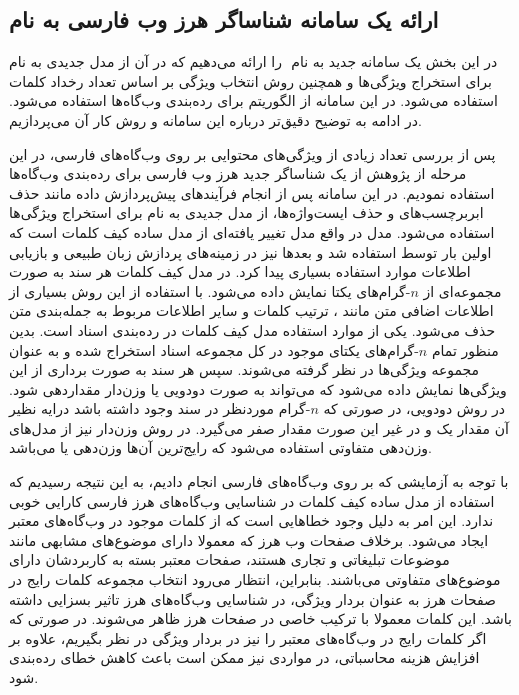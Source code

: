 \documentclass[twoside, a4paper,11pt]{book}
\numberwithin{equation}{chapter}
\numberwithin{table}{chapter}
\numberwithin{figure}{chapter}
\numberwithin{equation}{chapter}
\begin{document}
\subsection{ارائه یک سامانه شناساگر هرز وب فارسی به نام }
\label{section:methodology-bosw}
در این بخش یک سامانه جدید به نام ‌ را ارائه می‌دهیم که در آن از مدل جدیدی به نام  برای استخراج ویژگی‌ها و همچنین روش انتخاب ویژگی بر اساس تعداد رخداد کلمات استفاده می‌شود. در این سامانه از الگوریتم  برای رده‌بندی وب‌گاه‌ها استفاده می‌شود. در ادامه به توضیح دقیق‌تر درباره این سامانه و روش کار آن می‌پردازیم.

پس از بررسی تعداد زیادی از ویژگی‌های محتوایی بر روی وب‌گاه‌‌های فارسی، در این مرحله از پژوهش از یک شناساگر جدید هرز وب فارسی برای رده‌بندی وب‌گاه‌ها استفاده نمودیم. در این سامانه پس از انجام فرآیندهای پیش‌پردازش داده مانند حذف ابربرچسب‌های  و حذف ایست‌واژه‌ها، از مدل جدیدی به نام  برای استخراج ویژگی‌ها استفاده می‌شود. مدل  در واقع مدل تغییر یافته‌ای از مدل ساده کیف کلمات است که اولین بار توسط  \cite{harris1954distributional} استفاده شد و بعدها نیز در زمینه‌های پردازش زبان طبیعی و بازیابی اطلاعات موارد استفاده بسیاری پیدا کرد. در مدل کیف کلمات هر سند به صورت مجموعه‌ای از  $n$-گرام‌های یکتا نمایش داده می‌شود. با استفاده از این روش بسیاری از اطلاعات اضافی متن مانند ‌، ترتیب کلمات و سایر اطلاعات مربوط به جمله‌بندی متن حذف می‌شود. یکی از موارد استفاده مدل کیف کلمات در رده‌بندی اسناد است. بدین منظور تمام  $n$-گرام‌های یکتای موجود در کل مجموعه اسناد استخراج شده و به عنوان مجموعه‌ ویژگی‌ها در نظر گرفته می‌شوند. سپس هر سند به صورت برداری از این ویژگی‌ها نمایش داده می‌شود که می‌تواند به صورت دودویی یا وزن‌دار مقدار‌دهی شود. در روش دودویی، در صورتی که  $n$-گرام موردنظر در سند وجود داشته باشد درایه نظیر آن مقدار یک و در غیر این صورت مقدار صفر می‌گیرد. در روش وزن‌دار نیز از مدل‌های وزن‌دهی متفاوتی استفاده می‌شود که رایج‌ترین آن‌ها وزن‌دهی  یا  می‌باشد. 

با توجه به آزمایشی که بر روی وب‌گاه‌های فارسی انجام دادیم، به این نتیجه رسیدیم که استفاده از مدل ساده کیف کلمات در شناسایی وب‌گاه‌های هرز فارسی کارایی خوبی ندارد. این امر به دلیل وجود خطاهایی است که از کلمات موجود در وب‌گاه‌های معتبر ایجاد می‌شود. برخلاف صفحات وب هرز که معمولا دارای موضوع‌های مشابهی مانند موضوعات تبلیغاتی و تجاری هستند، صفحات معتبر بسته به کاربردشان دارای موضوع‌های متفاوتی می‌باشند. بنابراین، انتظار می‌رود انتخاب مجموعه کلمات رایج در صفحات هرز به عنوان بردار ویژگی، در شناسایی وب‌گاه‌های هرز تاثیر بسزایی داشته باشد. این کلمات معمولا با ترکیب خاصی در صفحات هرز ظاهر می‌شوند. در صورتی که اگر کلمات رایج در وب‌گاه‌های معتبر را نیز در بردار ویژگی در نظر بگیریم، علاوه بر افزایش هزینه محاسباتی، در مواردی نیز ممکن است باعث کاهش خطای رده‌بندی شود.  
\end{document}

